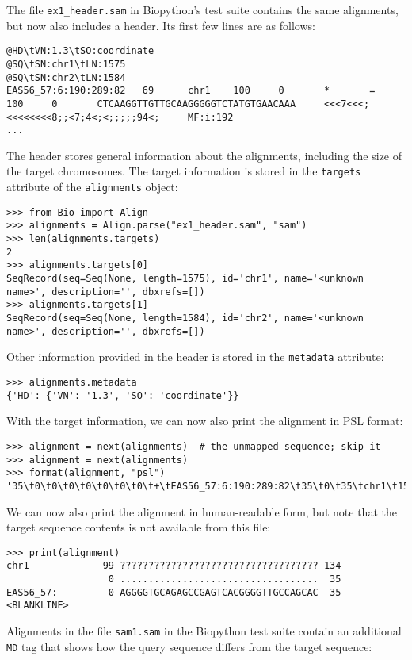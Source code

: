 The file \verb+ex1_header.sam+ in Biopython's test suite contains the same alignments, but now also includes a header. Its first few lines are as follows:
\begin{verbatim}
@HD\tVN:1.3\tSO:coordinate
@SQ\tSN:chr1\tLN:1575
@SQ\tSN:chr2\tLN:1584
EAS56_57:6:190:289:82   69      chr1    100     0       *       =       100     0       CTCAAGGTTGTTGCAAGGGGGTCTATGTGAACAAA     <<<7<<<;<<<<<<<<8;;<7;4<;<;;;;;94<;     MF:i:192
...
\end{verbatim}
The header stores general information about the alignments, including the size of the target chromosomes. The target information is stored in the \verb|targets| attribute of the \verb|alignments| object:
\begin{verbatim}
>>> from Bio import Align
>>> alignments = Align.parse("ex1_header.sam", "sam")
>>> len(alignments.targets)
2
>>> alignments.targets[0]
SeqRecord(seq=Seq(None, length=1575), id='chr1', name='<unknown name>', description='', dbxrefs=[])
>>> alignments.targets[1]
SeqRecord(seq=Seq(None, length=1584), id='chr2', name='<unknown name>', description='', dbxrefs=[])
\end{verbatim}
Other information provided in the header is stored in the \verb|metadata| attribute:
\begin{verbatim}
>>> alignments.metadata
{'HD': {'VN': '1.3', 'SO': 'coordinate'}}
\end{verbatim}
With the target information, we can now also print the alignment in PSL format:
\begin{verbatim}
>>> alignment = next(alignments)  # the unmapped sequence; skip it
>>> alignment = next(alignments)
>>> format(alignment, "psl")
'35\t0\t0\t0\t0\t0\t0\t0\t+\tEAS56_57:6:190:289:82\t35\t0\t35\tchr1\t1575\t99\t134\t1\t35,\t0,\t99,\n'
\end{verbatim}
We can now also print the alignment in human-readable form, but note that the target sequence contents is not available from this file:
\begin{verbatim}
>>> print(alignment)
chr1             99 ??????????????????????????????????? 134
                  0 ...................................  35
EAS56_57:         0 AGGGGTGCAGAGCCGAGTCACGGGGTTGCCAGCAC  35
<BLANKLINE>
\end{verbatim}
Alignments in the file \verb|sam1.sam| in the Biopython test suite contain an additional \verb+MD+ tag that shows how the query sequence differs from the target sequence:
